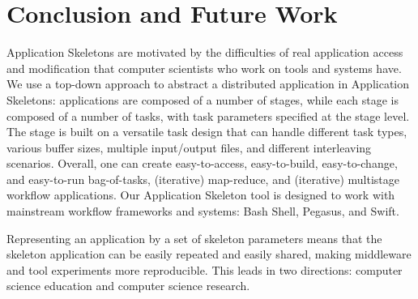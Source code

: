 \documentclass[preprint,12pt]{elsarticle}
\newcommand{\katznote}[1]{ {\textcolor{blue}    { ***Dan:   #1 }}}
\newcommand{\katznote}[1]{}
\begin{document}
%
%
%
%

\section{Conclusion and Future Work}\label{lb:Con}

Application Skeletons are motivated by the difficulties of real application access and modification that computer scientists who work on tools and systems have. We use a top-down approach to abstract a distributed application in Application Skeletons: applications 
are composed of a number of stages, while each stage is composed of a number of tasks, with task parameters specified at the stage level. The stage is built on a versatile task design that can handle different task types, various buffer
sizes, multiple input/output files, and different interleaving scenarios. Overall, one can create easy-to-access, easy-to-build, easy-to-change, and easy-to-run bag-of-tasks, 
(iterative) map-reduce, and (iterative) multistage workflow applications. Our Application Skeleton  tool is designed to work with mainstream workflow
frameworks and systems: Bash Shell, Pegasus, and Swift.

Representing an application by a set of skeleton parameters means that the skeleton application  can be easily repeated and easily shared, making 
middleware and tool experiments more reproducible.  This leads in two directions: computer science education and computer science research.
\end{document}
